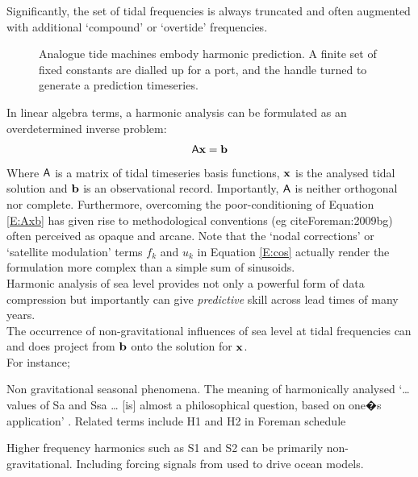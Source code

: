 Significantly, the set of tidal frequencies is always truncated and often augmented with additional `compound' or `overtide' frequencies.\\


\begin{figure}[!h]
	\centering
	\caption{Analogue tide machines embody harmonic prediction.  A finite set of fixed constants are dialled up for a port, and the handle turned to generate a prediction timeseries.}
	\label{fig:tide_machines}
\end{figure}


In linear algebra terms,  a harmonic analysis can be formulated as an overdetermined inverse problem:
\begin{equation}
\label{E:Axb}
\mathsf{A} \mathbf{x}=\mathbf{b} 
\end{equation}
Where $\mathsf{A}$ is a matrix of tidal timeseries basis functions, $\mathbf{x}$ is the analysed tidal solution and $\mathbf{b}$ is an observational record. Importantly, $\mathsf{A}$ is neither orthogonal nor complete. Furthermore, overcoming the poor-conditioning of Equation \ref{E:Axb} has given rise to methodological conventions (eg cite{Foreman:2009bg}) often perceived as opaque and arcane.
Note that the `nodal corrections' or `satellite modulation' \citep{Foreman:2009bg} terms $f_k$ and $u_k$ in Equation \ref{E:cos} actually render the formulation more complex than a simple sum of sinusoids.\\
Harmonic analysis of sea level provides not only a powerful form of data compression \citep{Flinchem:2000kp} but importantly can give \emph{predictive} skill across lead times of many years.\\



\label{S:nongravity}
The occurrence of non-gravitational influences of sea level at tidal frequencies can and does project from $\mathbf{b}$ onto the solution for $\mathbf{x}$.\\
For instance;
\begin{compactitem}
\item Non gravitational seasonal phenomena.  The meaning of harmonically analysed `\dots{} values of Sa and Ssa \dots{} [is] almost a philosophical question, based on one�s application' \citep[p122]{Parker:2007wq}.   Related terms include H1 and H2 in Foreman schedule \citep{Foreman:1977ua}\\
\item Higher frequency harmonics such as S1 and S2 can be primarily non-gravitational.  Including forcing signals from \NWP{} \citep{Ray:2003ui} used to drive ocean models.\\
\end{compactitem}

